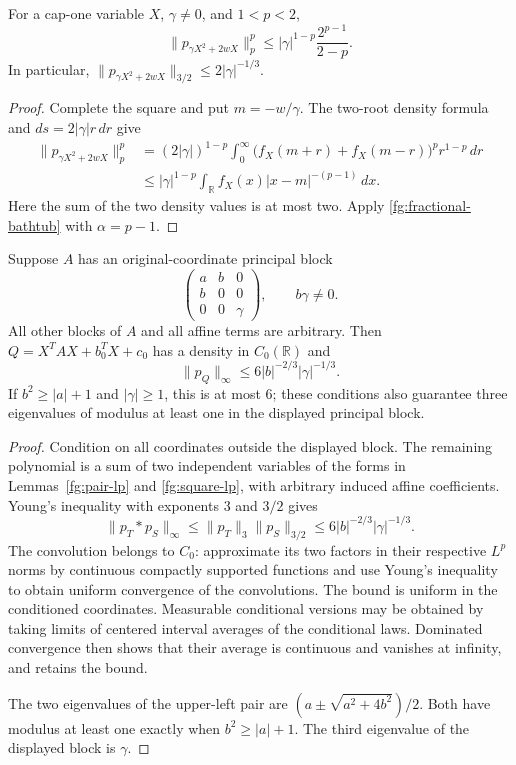 \begin{lemma}\label{fg:square-lp}
For a cap-one variable $X$, $\gamma\ne0$, and $1<p<2$,
\begin{equation}\label{fg:square-lp-bound}
 \|p_{\gamma X^2+2wX}\|_p^p
 \leq |\gamma|^{1-p}\frac{2^{p-1}}{2-p}.
\end{equation}
In particular,
$\|p_{\gamma X^2+2wX}\|_{3/2}\leq2|\gamma|^{-1/3}$.
\end{lemma}
\begin{proof}
Complete the square and put $m=-w/\gamma$.
The two-root density formula and $ds=2|\gamma|r\,dr$ give
\begin{align*}
 \|p_{\gamma X^2+2wX}\|_p^p
 &=(2|\gamma|)^{1-p}
     \int_0^\infty
      \bigl(f_X(m+r)+f_X(m-r)\bigr)^p r^{1-p}\,dr\\
 &\leq|\gamma|^{1-p}
       \int_{\mathbb R}f_X(x)|x-m|^{-(p-1)}\,dx .
\end{align*}
Here the sum of the two density values is at most two.
Apply \eqref{fg:fractional-bathtub} with $\alpha=p-1$.
\end{proof}

\begin{theorem}\label{fg:pair-square}
Suppose $A$ has an original-coordinate principal block
\[
 \begin{pmatrix}
  a&b&0\\
  b&0&0\\
  0&0&\gamma
 \end{pmatrix},
 \qquad b\gamma\ne0.
\]
All other blocks of $A$ and all affine terms are arbitrary.
Then $Q=X^TAX+b_0^TX+c_0$ has a density in $C_0(\mathbb R)$
and
\begin{equation}\label{fg:pair-square-bound}
 \|p_Q\|_\infty\leq6|b|^{-2/3}|\gamma|^{-1/3}.
\end{equation}
If $b^2\geq|a|+1$ and $|\gamma|\geq1$, this is at most $6$;
these conditions also guarantee three eigenvalues of modulus
at least one in the displayed principal block.
\end{theorem}
\begin{proof}
Condition on all coordinates outside the displayed block.
The remaining polynomial is a sum of two independent
variables of the forms in Lemmas~\ref{fg:pair-lp} and
\ref{fg:square-lp}, with arbitrary induced affine coefficients.
Young's inequality with exponents $3$ and $3/2$ gives
\[
 \|p_T*p_S\|_\infty
 \leq\|p_T\|_3\|p_S\|_{3/2}
 \leq6|b|^{-2/3}|\gamma|^{-1/3}.
\]
The convolution belongs to $C_0$: approximate its two
factors in their respective $L^p$ norms by continuous
compactly supported functions and use Young's inequality
to obtain uniform convergence of the convolutions.
The bound is uniform in the conditioned coordinates.
Measurable conditional versions may be obtained by taking
limits of centered interval averages of the conditional laws.
Dominated convergence then shows that their average is
continuous and vanishes at infinity, and retains the bound.

The two eigenvalues of the upper-left pair are
$(a\pm\sqrt{a^2+4b^2})/2$.  Both have modulus at least one
exactly when $b^2\geq|a|+1$.
The third eigenvalue of the displayed block is $\gamma$.
\end{proof}

